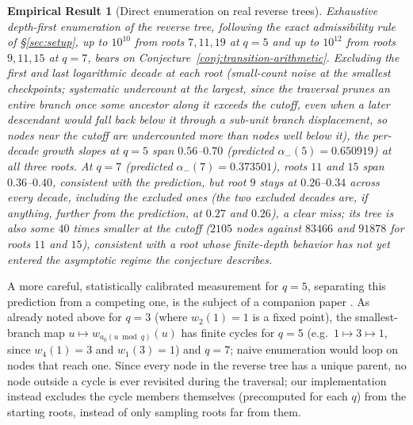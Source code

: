 \documentclass[11pt]{article}
\newtheorem{empirical}[theorem]{Empirical Result}
\theoremstyle{remark}
\begin{document}
\begin{empirical}[Direct enumeration on real reverse trees]\label{emp:real-trees}
Exhaustive depth-first enumeration of the reverse tree, following the
exact admissibility rule of \S\ref{sec:setup}, up to $10^{10}$ from
roots $7,11,19$ at $q=5$ and up to $10^{12}$ from roots $9,11,15$ at
$q=7$, bears on Conjecture~\ref{conj:transition-arithmetic}. Excluding
the first and last logarithmic decade at each root (small-count noise
at the smallest checkpoints; systematic undercount at the largest, since
the traversal prunes an entire branch once some ancestor along it
exceeds the cutoff, even when a later descendant would fall back below
it through a sub-unit branch displacement, so nodes near the cutoff are
undercounted more than nodes well below it), the per-decade growth
slopes at $q=5$ span $0.56$--$0.70$ (predicted $\alpha_-(5)=0.650919$)
at all three roots. At $q=7$ (predicted $\alpha_-(7)=0.373501$), roots
$11$ and $15$ span $0.36$--$0.40$, consistent with the prediction, but
root $9$ stays at $0.26$--$0.34$ across every decade, including the
excluded ones (the two excluded decades are, if anything, further from
the prediction, at $0.27$ and $0.26$), a clear miss; its tree is also
some $40$ times smaller
at the cutoff ($2105$ nodes against $83466$ and $91878$ for roots $11$
and $15$), consistent with a root whose finite-depth behavior has not
yet entered the asymptotic regime the conjecture describes.
\end{empirical}

A more careful,
statistically calibrated measurement for $q=5$, separating this
prediction from a competing one, is the subject of a companion paper
\cite{KLVolkovCompanion}. As already noted above for $q=3$ (where
$w_2(1)=1$ is a fixed point), the smallest-branch map
$u\mapsto w_{a_0(u\bmod q)}(u)$ has finite cycles for $q=5$ (e.g.\
$1\mapsto3\mapsto1$, since $w_4(1)=3$ and $w_1(3)=1$) and $q=7$; naive
enumeration would loop on nodes that reach one. Since every node in the
reverse tree has a unique parent, no node outside a cycle is ever
revisited during the traversal; our implementation instead excludes
the cycle members themselves (precomputed for each $q$) from the
starting roots, instead of only sampling roots far from them.
\end{document}
